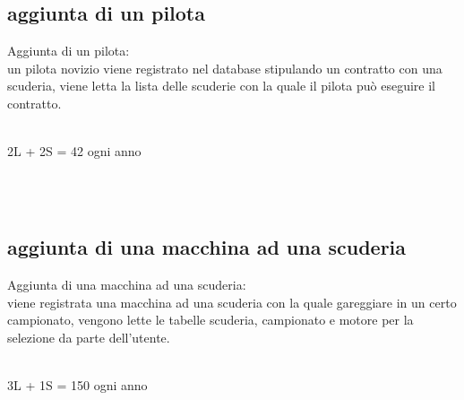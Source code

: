 \documentclass[a4paper,12pt]{report}
\begin{document}
			\subsection{aggiunta di un pilota}
			Aggiunta di un pilota:\\
			un pilota novizio viene registrato nel database stipulando un contratto con una scuderia,
			viene letta la lista delle scuderie con la quale il pilota può eseguire il contratto.
			\begin{table}[!htb]
				\centering
				\begin{center}
				\newline\\
				2L + 2S = 42 ogni anno\\
				\end{center}
			\end{table}\\\\
			\subsection{aggiunta di una macchina ad una scuderia}
			Aggiunta di una macchina ad una scuderia:\\
			viene registrata una macchina ad una scuderia con la quale gareggiare in un certo campionato,
			vengono lette le tabelle scuderia, campionato e motore per la selezione da parte dell'utente.
			\begin{table}[!htb]
				\centering
				\begin{center}
				\newline\\
				3L + 1S = 150 ogni anno\\
				\end{center}
			\end{table}\\
			\newpage
\end{document}
